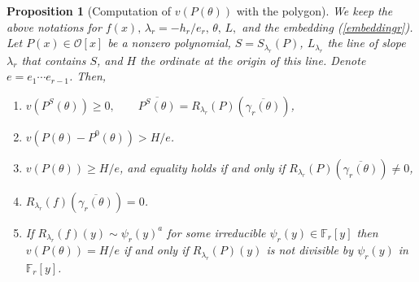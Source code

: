 \documentclass{amsart}
\newtheorem{proposition}[theorem]{Proposition}
\def\ff#1{\mathbb{F}_{#1}}
\def\gb#1{\overline{\gamma_{#1}(\t)}}
\def\la{\lambda}
\def\oo{{\mathcal O}}
\def\t{\theta}
\def\zpx{\oo[x]}
\begin{document}
\begin{proposition}[Computation of $v(P(\t))$ with the polygon]\label{vqtr}
We keep the above notations for $f(x),\,\la_r=-h_r/e_r,\,\t,\,L,$ and the embedding (\ref{embeddingr}).  Let $P(x)\in\zpx$ be a nonzero polynomial, $S=S_{\la_r}(P)$, $L_{\la_r}$ the line of slope $\la_r$ that contains $S$, and $H$ the ordinate at the origin of this line. Denote $e=e_1\cdots e_{r-1}$. Then,  
\begin{enumerate}
 \item $v(P^S(\t))\ge0,\qquad \overline{P^S(\t)}=R_{\la_r}(P)(\gb{r})$,
\item $v(P(\t)-P^0(\t))>H/e$.
\item $v(P(\t))\ge H/e$, and equality holds if and only if $R_{\la_r}(P)(\gb{r})\ne0$,
\item $R_{\la_r}(f)(\gb{r})=0$.
\item  If $R_{\la_r}(f)(y)\sim \psi_r(y)^a$ for some irreducible $\psi_r(y)\in\ff{r}[y]$ then $v(P(\t))=H/e$  if and only if $R_{\la_r}(P)(y)$ is not divisible by $\psi_r(y)$ in $\ff{r}[y]$.
\end{enumerate}
\end{proposition}
\end{document}
